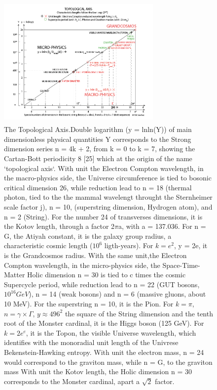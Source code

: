 \documentclass[twoside,draft]{article}
\begin{document}
\begin{sloppypar}
{\begin{figure}
\centering
\includegraphics[width=8cm,height=6.5cm]{./figures/figure}
\caption{The Topological Axis.Double logarithm (y = lnln(Y)) of main dimensionless physical quantities 
Y corresponds to the Strong dimension series n = 4k + 2, from k = 0 to k = 7, showing the Cartan-Bott
periodicity 8 [25] which at the origin of the name `topological axis`.
    With unit the Electron Compton wavelength, in the macro-physics side, the Universe circumference 
    is tied to bosonic critical dimension 26, while reduction lead to n = 18 (thermal photon, 
    tied to the the mammal wavelengt throught the Sternheimer scale factor j), n = 10, (superstring 
    dimension, Hydrogen atom), and n = 2 (String). For the number 24 of transverses dimensions, it is
    the Kotov length, through a factor 2$\pi$a, with a = 137.036. For n = G, the Atiyah constant, it is the 
    galaxy group radius, a characteristic cosmic length ($10^{6}$ ligth-years). For $k = e^{2}$, y = 2e, it is 
    the Grandcosmos radius.
    With the same unit,the Electron Compton wavelength, in the micro-physics side, the Space-Time-Matter
    Holic dimension n = 30 is tied to c times the cosmic Supercycle period, while reduction lead to
    n = 22 (GUT bosons, $10^{16} GeV$), n = 14 (weak bosons) and n = 6 (massive gluons, about 10 MeV).
    For the superstring n = 10, it is the Pion.  For $k = \pi$, $n = \gamma \times \Gamma$, $y \approx 496^2$ 
    the square of the String dimension and the tenth root of the Monster cardinal, it is
    the Higgs boson (125 GeV). For $k = 2e^e$, it is the Topon, the visible Universe wavelength,
    which identifies with the monoradial unit length of the Univrese Bekenstein-Hawking entropy.
    With unit the electron mass, n = 24 would correspond to the graviton mass, while n = G, 
    to the graviton mass
    With unit the Kotov length, the Holic dimension n = 30 corresponds to the Monster cardinal, 
    apart a $\sqrt2$ factor.}
\label{fig:figure_label}
\end{figure}

}
\end{sloppypar}
\end{document}
